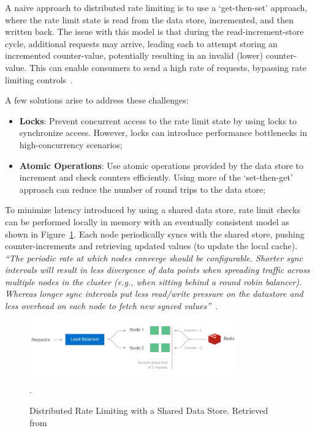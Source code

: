 A naive approach to distributed rate limiting is to use a `get-then-set' approach,
where the rate limit state is read from the data store, incremented, and then written back.
The issue with this model is that during the read-increment-store cycle, additional requests may arrive, leading each to attempt storing an incremented counter-value, potentially resulting in an invalid (lower) counter-value.
This can enable consumers to send a high rate of requests, bypassing rate limiting controls~\cite{kong-rate-limiting}.

A few solutions arise to address these challenges:

\begin{itemize}
    \item \textbf{Locks}: Prevent concurrent access to the rate limit state by using locks to synchronize access.
    However, locks can introduce performance bottlenecks in high-concurrency scenarios;
    \item \textbf{Atomic Operations}:
    Use atomic operations provided by the data store to increment and check counters efficiently.
    Using more of the `set-then-get' approach can reduce the number of round trips to the data store;
\end{itemize}

To minimize latency introduced by using a shared data store,
rate limit checks can be performed locally in memory with an eventually consistent model as shown in Figure~\ref{fig:distributed-rate-limiting-shared}.
Each node periodically syncs with the shared store,
pushing counter-increments and retrieving updated values (to update the local cache).
\textit{\enquote{The periodic rate at which nodes converge should be configurable. Shorter sync intervals will result in less divergence of data points when spreading traffic across multiple nodes in the cluster (e.g., when sitting behind a round robin balancer). Whereas longer sync intervals put less read/write pressure on the datastore and less overhead on each node to fetch new synced values}}~\cite{kong-rate-limiting}.

\begin{figure}[!htb]
    \centering
    \includegraphics[width=0.8\textwidth]{../figures/06_distributed_rate_limiting}
    \caption{Distributed Rate Limiting with a Shared Data Store.
    Retrieved from~\cite{kong-rate-limiting}}.
    \label{fig:distributed-rate-limiting-shared}
\end{figure}



